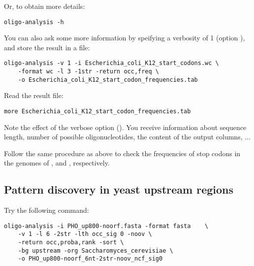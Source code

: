 Or, to obtain more details:
{\color{Blue} \begin{footnotesize} 
\begin{verbatim}
oligo-analysis -h
\end{verbatim} \end{footnotesize}
}

You can also ask some more information by speifying a verbosity of 1
(option ), and store the result in a file:

{\color{Blue} \begin{footnotesize} 
\begin{verbatim}
oligo-analysis -v 1 -i Escherichia_coli_K12_start_codons.wc \
    -format wc -l 3 -1str -return occ,freq \
    -o Escherichia_coli_K12_start_codon_frequencies.tab
\end{verbatim} \end{footnotesize}
}

Read the result file:

{\color{Blue} \begin{footnotesize} 
\begin{verbatim}
more Escherichia_coli_K12_start_codon_frequencies.tab
\end{verbatim} \end{footnotesize}
}


Note the effect of the verbose option (). You receive
information about sequence length, number of possible
oligonucleotides, the content of the output columns, ...


\begin{exercise}
  Follow the same procedure as above to check the frequencies of stop
  codons in the genomes of , and
  \org{Saccharomyces cerevisia}, respectively.
\end{exercise}

\subsection{Pattern discovery in yeast upstream regions}

Try the following command:

{\color{Blue} \begin{footnotesize} 
\begin{verbatim} 
oligo-analysis -i PHO_up800-noorf.fasta -format fasta    \
    -v 1 -l 6 -2str -lth occ_sig 0 -noov \
    -return occ,proba,rank -sort \
    -bg upstream -org Saccharomyces_cerevisiae \
    -o PHO_up800-noorf_6nt-2str-noov_ncf_sig0 
\end{verbatim} \end{footnotesize}
}



